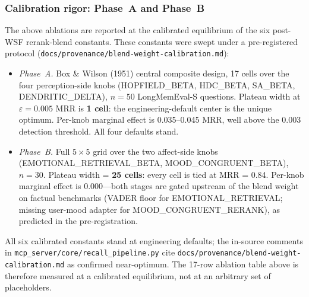\documentclass[11pt]{article}
\begin{document}
\subsubsection{Calibration rigor: Phase~A and Phase~B}
\label{sec:calibration}

The above ablations are reported at the calibrated equilibrium of
the six post-WSF rerank-blend constants.  These constants were
swept under a pre-registered protocol
(\texttt{docs/provenance/blend-weight-calibration.md}):

\begin{itemize}
\item \emph{Phase~A.}  Box \& Wilson (1951) central composite design,
  17 cells over the four perception-side knobs (HOPFIELD\_BETA,
  HDC\_BETA, SA\_BETA, DENDRITIC\_DELTA), $n = 50$ LongMemEval-S
  questions.  Plateau width at $\varepsilon = 0.005$ MRR is
  \textbf{1 cell}: the engineering-default center is the unique
  optimum.  Per-knob marginal effect is 0.035--0.045 MRR, well above
  the 0.003 detection threshold.  All four defaults stand.
\item \emph{Phase~B.}  Full $5{\times}5$ grid over the two
  affect-side knobs (EMOTIONAL\_RETRIEVAL\_BETA,
  MOOD\_CONGRUENT\_BETA), $n = 30$.  Plateau width = \textbf{25
  cells}: every cell is tied at MRR = 0.84.  Per-knob marginal
  effect is 0.000---both stages are gated upstream of the blend
  weight on factual benchmarks (VADER floor for
  EMOTIONAL\_RETRIEVAL; missing user-mood adapter for
  MOOD\_CONGRUENT\_RERANK), as predicted in the pre-registration.
\end{itemize}

All six calibrated constants stand at engineering defaults; the
in-source comments in \texttt{mcp\_server/core/recall\_pipeline.py}
cite \texttt{docs/provenance/blend-weight-calibration.md} as confirmed
near-optimum.  The 17-row ablation table above is therefore
measured at a calibrated equilibrium, not at an arbitrary set of
placeholders.
\end{document}
